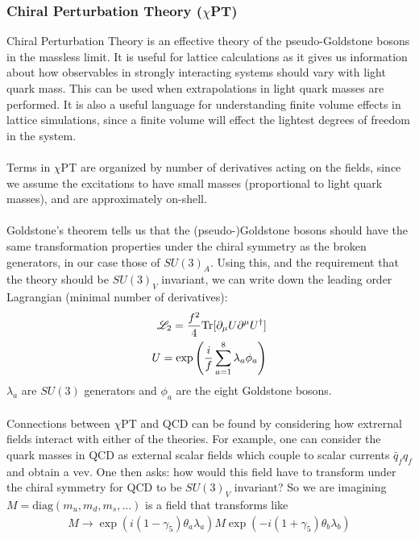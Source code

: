 \subsubsection{Chiral Perturbation Theory ($\chi$PT)}

Chiral Perturbation Theory is an effective theory of the pseudo-Goldstone bosons in the massless limit. It is useful for lattice calculations as it gives us information about how observables in strongly interacting systems should vary with light quark mass. This can be used when extrapolations in light quark masses are performed. It is also a useful language for understanding finite volume effects in lattice simulations, since a finite volume will effect the lightest degrees of freedom in the system.
\\ \\
Terms in $\chi$PT are organized by number of derivatives acting on the fields, since we assume the excitations to have small masses (proportional to light quark masses), and are approximately on-shell.
\\ \\
Goldstone's theorem tells us that the (pseudo-)Goldstone bosons should have the same transformation properties under the chiral symmetry as the broken generators, in our case those of $SU(3)_A$. Using this, and the requirement that the theory should be $SU(3)_V$ invariant, we can write down the leading order Lagrangian (minimal number of derivatives):
\begin{align}
  \label{eq:chipt}
  \mathscr{L}_2 = {f^2\over 4} \text{Tr}[ \partial_{\mu} U \partial^{\mu}U^{\dagger} ] \\
  U = \exp\left( {i\over f} \sum_{a=1}^8 \lambda_a \phi_a \right)
\end{align}
$\lambda_a$ are $SU(3)$ generators and $\phi_a$ are the eight Goldstone bosons.
\\ \\
Connections between $\chi$PT and QCD can be found by considering how extrernal fields interact with either of the theories. For example, one can consider the quark masses in QCD as external scalar fields which couple to scalar currents $\bar{q}_f q_f$ and obtain a vev. One then asks: how would this field have to transform under the chiral symmetry for QCD to be $SU(3)_V$ invariant? So we are imagining $M=\text{diag}(m_u,m_d,m_s,...)$ is a field that transforms like
\begin{align}
  M \to \exp(i(1-\gamma_5)\theta_a\lambda_a) M \exp(-i(1+\gamma_5)\theta_b\lambda_b)
\end{align}
